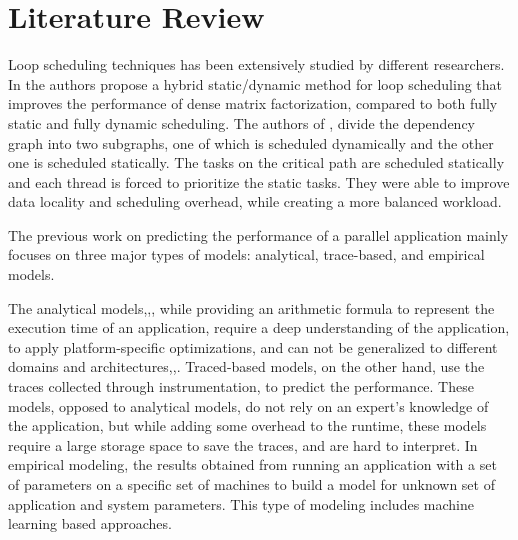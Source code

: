 \section{Literature Review}

Loop scheduling techniques has been extensively studied by different researchers. In \cite{donfack2012hybrid} the authors propose a hybrid static/dynamic method for loop scheduling that improves the performance of dense matrix factorization, compared to both fully static and fully dynamic scheduling. The authors of \cite{donfack2012hybrid}, divide the dependency graph into two subgraphs, one of which is scheduled dynamically and the other one is scheduled statically. The tasks on the critical path are scheduled statically and each thread is forced to prioritize the static tasks\cite{donfack2012hybrid}. They were able to improve data locality and scheduling overhead, while creating a more balanced workload. 

%	

The previous work on predicting the performance of a parallel application mainly focuses on three major types of models: analytical, trace-based, and empirical models\cite{malakar2018benchmarking}. 

The analytical models\cite{blagojevic2008modeling},\cite{kerbyson2001predictive},\cite{valiant1990bridging}, while providing an arithmetic formula to represent the execution time of an application, require a deep understanding of the application, to apply platform-specific optimizations, and can not be generalized to different domains and architectures\cite{lee2007methods},\cite{sun2017automated},\cite{pllana2007performance}.
Traced-based models, on the other hand, use the traces collected through instrumentation, to predict the performance. These models, opposed to analytical models, do not rely on an expert's knowledge of the application, but while adding some overhead to the runtime, these models require a large storage space to save the traces, and are hard to interpret\cite{sun2017automated}.   
In empirical modeling, the results obtained from running an application with a set of parameters on a specific set of machines to build a model for unknown set of application and system parameters\cite{malakar2018benchmarking}. This type of modeling includes machine learning based approaches.

